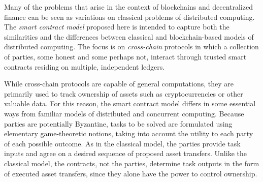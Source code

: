 Many of the problems that arise in the context of blockchains and decentralized
finance can be seen as variations on classical problems of distributed computing.
The \emph{smart contract model} proposed here is intended to capture both the
similarities and the differences between classical and blockchain-based models of distributed computing.
The focus is on \emph{cross-chain} protocols
in which a collection of parties,
some honest and some perhaps not,
interact through trusted smart contracts residing on multiple, independent ledgers.

While cross-chain protocols are capable of general computations,
they are primarily used to track ownership of assets
such as cryptocurrencies or other valuable data.
For this reason, the smart contract model differs in some essential ways from
familiar models of distributed and concurrent computing.
Because parties are potentially Byzantine,
tasks to be solved are formulated using elementary game-theoretic notions,
taking into account the utility to each party of each possible outcome.
As in the classical model,
the parties provide task inputs and agree on a desired sequence of
proposed asset transfers.
Unlike the classical model,
the contracts, not the parties, determine task outputs in the form of executed asset transfers,
since they alone have the power to control ownership.